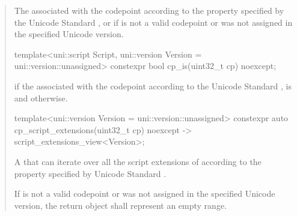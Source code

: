 \documentclass{wg21}
\begin{document}
\begin{quote}
\begin{itemdescr}

\mandates {}

\returns The  associated with the codepoint  according to the  property specified by the Unicode Standard ,
or  if  is not a valid codepoint or was not assigned in the specified Unicode version.

\end{itemdescr}

\begin{itemdecl}
template<uni::script Script, uni::version Version = uni::version::unassigned>
constexpr bool cp_is(uint32_t cp) noexcept;
\end{itemdecl}

\begin{itemdescr}

\mandates {}

\returns {} if the  associated with the codepoint  according to the Unicode Standard ,
is   and  otherwise.

\end{itemdescr}

\begin{itemdecl}
template<uni::version Version = uni::version::unassigned>
constexpr auto cp_script_extensions(uint32_t cp) noexcept
-> script_extensions_view<Version>;
\end{itemdecl}

\begin{itemdescr}

\mandates {}

\returns A  that can iterate over all the script extensions of
 according to the  property specified by  Unicode Standard .

If  is not a valid codepoint or was not assigned in the specified Unicode version, the return object shall represent an empty range.


\end{itemdescr}
\end{quote}
\end{document}
